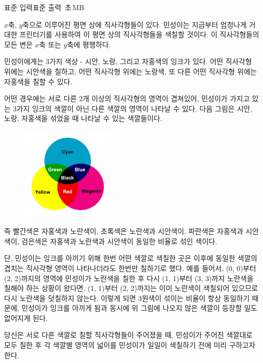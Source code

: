 \begin{problem}{\kcpccymktitle}
    {표준 입력}{표준 출력}
    {\kcpccymktime\,초}{\kcpccymkmemory\,MB}{}{\kcpccymkscore}
    
    $ x $축, $ y $축으로 이루어진 평면 상에 직사각형들이 있다. 민성이는 지금부터 엄청나게 거대한 프린터기를 사용하여 이 평면 상의 직사각형들을 색칠할 것이다. 이 직사각형들의 모든 변은 $ x $축 또는 $ y $축에 평행하다.
    
    민성이에게는 3가지 색상 - 시안, 노랑, 그리고 자홍색의 잉크가 있다. 어떤 직사각형 위에는 시안색을 칠하고, 어떤 직사각형 위에는 노랑색, 또 다른 어떤 직사각형 위에는 자홍색을 칠할 수 있다.
    
    어떤 경우에는 서로 다른 2개 이상의 직사각형의 영역이 겹쳐있어, 민성이가 가지고 있는 3가지 잉크의 색깔이 아닌 다른 색깔의 영역이 나타날 수 있다. 다음 그림은 시안, 노랑, 자홍색을 섞었을 때 나타날 수 있는 색깔들이다.
    
    \begin{figure}[h]
        \centering
        \includegraphics[width=0.4\textwidth]{./problems/cymk.jpeg}
    \end{figure}
    
    즉 빨간색은 자홍색과 노란색이, 초록색은 노란색과 시안색이, 파란색은 자홍색과 시안색이, 검은색은 자홍색과 노란색과 시안색이 동일한 비율로 섞인 색이다.
    
    단, 민성이는 잉크를 아끼기 위해 한번 어떤 색깔로 색칠한 곳은 이후에 동일한 색깔의 겹치는 직사각형 영역이 나타나더라도 한번만 칠하기로 했다. 예를 들어서, (0, 0)부터 (2, 2)까지의 영역에 민성이가 노란색을 칠한 후 다시 (1, 1)부터 (3, 3)까지 노란색을 칠해야 하는 상황이 왔다면, (1, 1)부터 (2, 2)까지는 이미 노란색이 색칠되어 있으므로 다시 노란색을 덧칠하지 않는다. 이렇게 되면 3원색이 섞이는 비율이 항상 동일하기 때문에, 민성이가 잉크를 아끼게 됨과 동시에 위 그림에 나오지 않은 색깔이 등장할 일도 없어지게 된다.
    
    당신은 서로 다른 색깔로 칠할 직사각형들이 주어졌을 때, 민성이가 주어진 색깔대로 모두 칠한 후 각 색깔별 영역의 넓이를 민성이가 일일이 색칠하기 전에 미리 구하고자 한다.
    

\end{problem}
